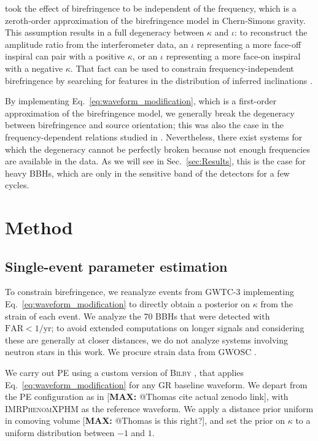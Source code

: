 \documentclass[aps,prd,twocolumn,superscriptaddress,preprintnumbers,floatfix,nofootinbib]{revtex4-2}
\newcommand*{\mi}[1]{\textsf{\color{magenta} [\textbf{MAX:} #1]}}
\begin{document}
\citet{Okounkova_2022} took the effect of birefringence to be independent of the frequency, which is a zeroth-order approximation of the birefringence model in Chern-Simons gravity.
This assumption results in a full degeneracy between $\kappa$ and $\iota$:
to reconstruct the amplitude ratio from the interferometer data, an $\iota$ representing a more face-off inspiral can pair with a positive $\kappa$, or an $\iota$ representing a more face-on inspiral with a negative $\kappa$.
That fact can be used to constrain frequency-independent birefringence by searching for features in the distribution of inferred inclinations \cite{Okounkova_2022}.

By implementing Eq.~\eqref{eq:waveform_modification}, which is a first-order approximation of the birefringence model, we generally break the degeneracy between birefringence and source orientation; this was also the case in the frequency-dependent relations studied in \cite{Yamada_2020,Wang_2021}.
Nevertheless, there exist systems for which the degeneracy cannot be perfectly broken because not enough frequencies are available in the data.
As we will see in Sec.~\ref{sec:Results}, this is the case for heavy \acp{BBH}, which are only in the sensitive band of the detectors for a few cycles.


\section{Method}
\label{sec:Method}

\subsection{Single-event parameter estimation}

To constrain birefringence, we reanalyze events from GWTC-3 \citep{GWTC-2.1, GWTC-3} implementing Eq.~\eqref{eq:waveform_modification} to directly obtain a posterior on $\kappa$ from the strain of each event.
We analyze the 70 \acp{BBH} that were detected with $\mathrm{FAR} < 1/\mathrm{yr}$; to avoid extended computations on longer signals and considering these are generally at closer distances, we do not analyze systems involving neutron stars in this work.
We procure strain data from \ac{GWOSC} \citep{GWOSC}.

We carry out \ac{PE} using a custom version of \textsc{Bilby} \citep{Bilby}, that applies Eq.~\eqref{eq:waveform_modification} for any \ac{GR} baseline waveform.
We depart from the \ac{PE} configuration as in \citet{GWTC-2.1, GWTC-3} \mi{@Thomas cite actual zenodo link}, with \textsc{IMRPhenomXPHM} as the reference waveform.
We apply a distance prior uniform in comoving volume \mi{@Thomas is this right?}, and set the prior on $\kappa$ to a uniform distribution between $-1$ and $1$.
\end{document}
